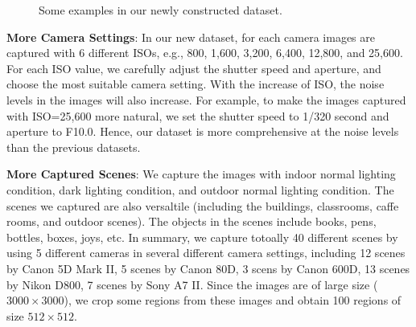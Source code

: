 \begin{figure}
{\begin{minipage}[t]{0.35\textwidth}
\end{minipage}
\begin{minipage}[t]{0.35\textwidth}
\centering
{}
\end{minipage}
}
\caption{Some examples in our newly constructed dataset.}
\label{fig6-3}
\end{figure}

\textbf{More Camera Settings}: In our new dataset, for each camera images are captured with 6 different ISOs, e.g., 800, 1,600, 3,200, 6,400, 12,800, and 25,600. For each ISO value, we carefully adjust the shutter speed and aperture, and choose the most suitable camera setting. With the increase of ISO, the noise levels in the images will also increase. For example, to make the images captured with ISO=25,600 more natural, we set the shutter speed to 1/320 second and aperture to F10.0. Hence, our dataset is more comprehensive at the noise levels than the previous datasets.

\textbf{More Captured Scenes}: We capture the images with indoor normal lighting condition, dark lighting condition, and outdoor normal lighting condition. The scenes we captured are also versaltile (including the buildings, classrooms, caffe rooms, and outdoor scenes). The objects in the scenes include books, pens, bottles, boxes, joys, etc. In summary, we capture totoally 40 different scenes by using 5 different cameras in several different camera settings, including 12 scenes by Canon 5D Mark II, 5 scenes by Canon 80D, 3 scens by Canon 600D, 13 scenes by Nikon D800, 7 scenes by Sony A7 II. Since the images are of large size ($3000\times3000$), we crop some regions from these images and obtain 100 regions of size $512\times512$.

